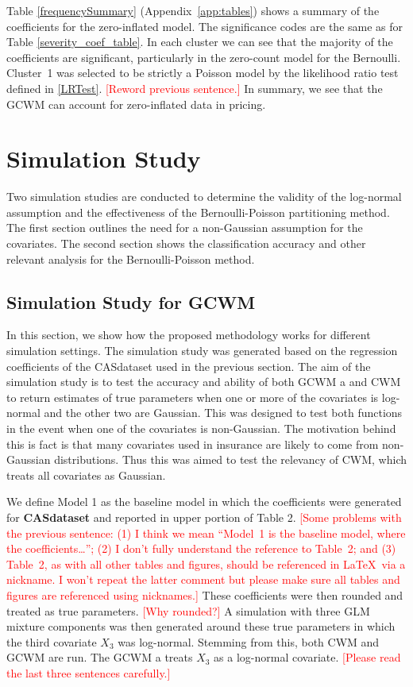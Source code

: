 \documentclass[11pt,letterpaper]{article}
\numberwithin{equation}{section}
\numberwithin{equation}{section}
\numberwithin{equation}{section}
\begin{document}
Table \ref{frequencySummary} (Appendix~\ref{app:tables}) shows a summary of the coefficients for the zero-inflated model. The
significance codes are the same as for Table \ref{severity_coef_table}. In each cluster we can see that the majority of the coefficients are significant, particularly in the zero-count model for the Bernoulli. Cluster~1 was selected to be strictly a Poisson model by the likelihood ratio test defined in \eqref{LRTest}. \textcolor{red}{[Reword previous sentence.]} In summary, we see that the GCWM can account for zero-inflated data in pricing.


\section{Simulation Study}\label{sec:sim}

Two simulation studies are conducted to determine the validity of the log-normal assumption and the effectiveness of the Bernoulli-Poisson partitioning method. The first section outlines the need for a non-Gaussian assumption for the covariates. The second section shows the classification accuracy and other relevant analysis for the Bernoulli-Poisson method.


\subsection{Simulation Study for GCWM}


In this section, we show how the proposed methodology works for different simulation settings. The simulation study was generated based on the regression coefficients of the CASdataset used in the previous section. The aim of the simulation study is to test the accuracy and ability of both GCWM a and CWM to return estimates of true parameters when one or more of the covariates is log-normal and the other two are Gaussian. This was designed to test both functions in the event when one of the covariates is non-Gaussian. The motivation behind this is fact is that many covariates used in insurance are likely to come from non-Gaussian distributions. Thus this was aimed to test the relevancy of CWM, which treats all covariates as Gaussian.

We define Model 1 as the baseline model in which the coefficients were generated for \textbf{CASdataset} and reported in upper portion of Table 2. \textcolor{red}{[Some problems with the previous sentence: (1) I think we mean ``Model~1 is the baseline model, where the coefficients\ldots''; (2) I don't fully understand the reference to Table~2; and (3) Table~2, as with all other tables and figures, should be referenced in \LaTeX\ via a nickname. I won't repeat the latter comment but please make sure all tables and figures are referenced using nicknames.]} These coefficients were then rounded and treated as true parameters. \textcolor{red}{[Why rounded?]} A simulation with three GLM mixture components was then generated around these true parameters in which the third covariate $X_3$ was log-normal. Stemming from this, both CWM and  GCWM are run. The  GCWM a treats $X_3$ as a log-normal covariate. \textcolor{red}{[Please read the last three sentences carefully.]}
\end{document}

